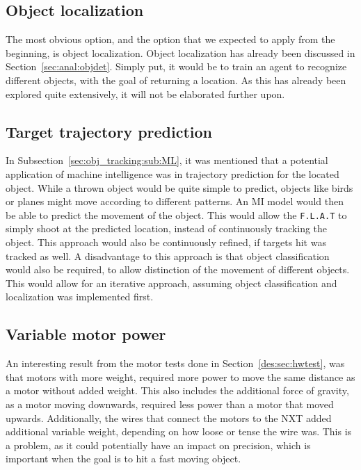 \subsection{Object localization}
The most obvious option, and the option that we expected to apply from the beginning, is object localization.
Object localization has already been discussed in Section~\ref{sec:anal:objdet}.
Simply put, it would be to train an agent to recognize different objects, with the goal of returning a location.
As this has already been explored quite extensively, it will not be elaborated further upon.

\subsection{Target trajectory prediction}
In Subsection~\ref{sec:obj_tracking:sub:ML}, it was mentioned that a potential application of machine intelligence was in trajectory prediction for the located object.
While a thrown object would be quite simple to predict, objects like birds or planes might move according to different patterns.
An MI model would then be able to predict the movement of the object.
This would allow the \texttt{F.L.A.T} to simply shoot at the predicted location, instead of continuously tracking the object.
This approach would also be continuously refined, if targets hit was tracked as well.
A disadvantage to this approach is that object classification would also be required, to allow distinction of the movement of different objects.
This would allow for an iterative approach, assuming object classification and localization was implemented first.

\subsection{Variable motor power}
An interesting result from the motor tests done in Section~\ref{des:sec:hwtest}, was that motors with more weight, required more power to move the same distance as a motor without added weight.
This also includes the additional force of gravity, as a motor moving downwards, required less power than a motor that moved upwards.
Additionally, the wires that connect the motors to the NXT added additional variable weight, depending on how loose or tense the wire was.
This is a problem, as it could potentially have an impact on precision, which is important when the goal is to hit a fast moving object.

